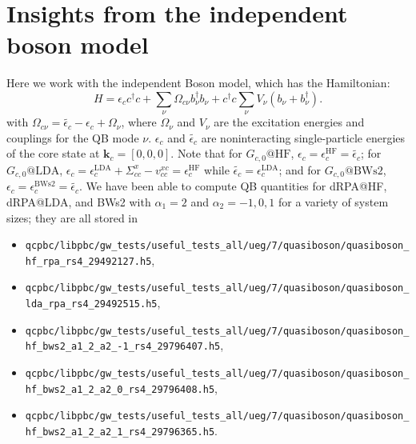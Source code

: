 \section{Insights from the independent boson model}
Here we work with the independent Boson model, which has the Hamiltonian:
\begin{equation}
H=\epsilon_c c^{\dagger} c+\sum_\nu \Omega_{c\nu} b_\nu^{\dagger} b_\nu+c^{\dagger} c \sum_\nu V_\nu\left(b_\nu+b_\nu^{\dagger}\right) .
\end{equation}
with $\Omega_{c\nu}= \tilde{\epsilon_c}-\epsilon_c+\Omega_\nu$, where $\Omega_\nu$ and $V_\nu$ are the excitation energies and couplings for the QB mode $\nu$. $\epsilon_c$ and $\tilde{\epsilon_c}$ are noninteracting single-particle energies of the core state at $\mathbf{k}_c=[0,0,0]$.  Note that for $G_{c,0}@\mathrm{HF}$, $\epsilon_c=\epsilon_c^{\mathrm{HF}}=\tilde{\epsilon_c}$; for $G_{c,0}@\mathrm{LDA}$, $\epsilon_c=\epsilon_c^{\mathrm{LDA}}+\Sigma_{cc}^{x}-v_{cc}^{xc}
=\epsilon_c^{\mathrm{HF}}$ while $\tilde{\epsilon_c}=\epsilon_c^{\mathrm{LDA}}$;
and for $G_{c,0}@\mathrm{BWs2}$, $\epsilon_c=\epsilon_c^{\mathrm{BWs2}}=\tilde{\epsilon_c}$. We have been able to compute QB quantities for dRPA@HF, dRPA@LDA, and BWs2 with $\alpha_1=2$ and $\alpha_2=-1,0,1$ for a variety of system sizes; they are all stored in
\begin{itemize}
    \item \texttt{qcpbc/libpbc/gw\_tests/useful\_tests\_all/ueg/7/quasiboson/quasiboson\_hf\_rpa\_rs4\_29492127.h5},
    \item \texttt{qcpbc/libpbc/gw\_tests/useful\_tests\_all/ueg/7/quasiboson/quasiboson\_lda\_rpa\_rs4\_29492515.h5},
    \item \texttt{qcpbc/libpbc/gw\_tests/useful\_tests\_all/ueg/7/quasiboson/quasiboson\_hf\_bws2\_a1\_2\_a2\_-1\_rs4\_29796407.h5},
    \item \texttt{qcpbc/libpbc/gw\_tests/useful\_tests\_all/ueg/7/quasiboson/quasiboson\_hf\_bws2\_a1\_2\_a2\_0\_rs4\_29796408.h5},
    \item \texttt{qcpbc/libpbc/gw\_tests/useful\_tests\_all/ueg/7/quasiboson/quasiboson\_hf\_bws2\_a1\_2\_a2\_1\_rs4\_29796365.h5}.
\end{itemize}
